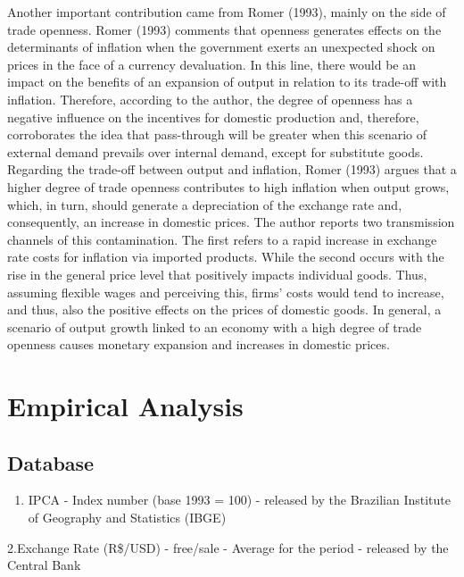 \documentclass[12pt]{article}
\providecommand{\tightlist}{%
  \setlength{\itemsep}{0pt}\setlength{\parskip}{0pt}}
\begin{document}
Another important contribution came from Romer (1993), mainly on the
side of trade openness. Romer (1993) comments that openness generates
effects on the determinants of inflation when the government exerts an
unexpected shock on prices in the face of a currency devaluation. In
this line, there would be an impact on the benefits of an expansion of
output in relation to its trade-off with inflation. Therefore, according
to the author, the degree of openness has a negative influence on the
incentives for domestic production and, therefore, corroborates the idea
that pass-through will be greater when this scenario of external demand
prevails over internal demand, except for substitute goods. Regarding
the trade-off between output and inflation, Romer (1993) argues that a
higher degree of trade openness contributes to high inflation when
output grows, which, in turn, should generate a depreciation of the
exchange rate and, consequently, an increase in domestic prices. The
author reports two transmission channels of this contamination. The
first refers to a rapid increase in exchange rate costs for inflation
via imported products. While the second occurs with the rise in the
general price level that positively impacts individual goods. Thus,
assuming flexible wages and perceiving this, firms' costs would tend to
increase, and thus, also the positive effects on the prices of domestic
goods. In general, a scenario of output growth linked to an economy with
a high degree of trade openness causes monetary expansion and increases
in domestic prices.

\hypertarget{empirical-analysis}{%
\section{Empirical Analysis}\label{empirical-analysis}}

\hypertarget{database}{%
\subsection{Database}\label{database}}

\begin{enumerate}
\def\labelenumi{\arabic{enumi}.}
\tightlist
\item
  IPCA - Index number (base 1993 = 100) - released by the Brazilian
  Institute of Geography and Statistics (IBGE)
\end{enumerate}

2.Exchange Rate (R\$/USD) - free/sale - Average for the period -
released by the Central Bank
\end{document}
